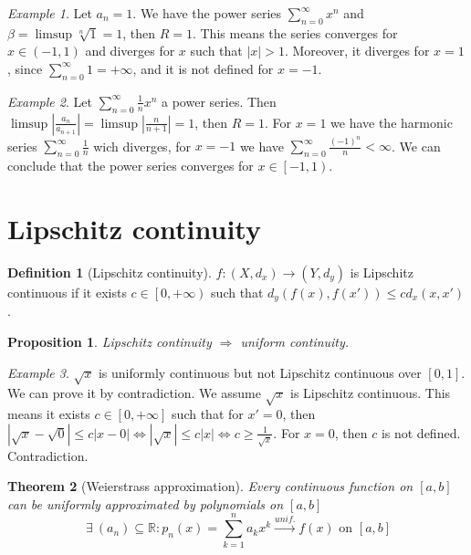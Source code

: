 \documentclass{article}
\newcommand{\DS}{\displaystyle}
\newcommand{\abs}[1]{\left|#1\right|}
\newcommand{\Ar}{\Rightarrow}
\newcommand{\f}[3]{#1 : #2 \rightarrow #3}
\newcommand{\intcc}[1]{\left[#1\right]}
\newcommand{\intco}[1]{\left[#1\right)}
\newcommand{\intoo}[1]{\left(#1\right)}
\newcommand{\tounif}{\xrightarrow{unif.}}
\theoremstyle{definition}
\newtheorem{definition}{Definition}[section]
\theoremstyle{definition}
\theoremstyle{plain}
\newtheorem{theorem}{Theorem}[section]
\theoremstyle{plain}
\theoremstyle{plain}
\theoremstyle{plain}
\newtheorem{proposition}[theorem]{Proposition}
\theoremstyle{definition}
\theoremstyle{remark}
\theoremstyle{remark}
\theoremstyle{remark}
\newtheorem{examplet}{Example}[theorem]
\theoremstyle{remark}
\newcommand{\R}{\mathbb{R}}
\newcommand{\sumn}{\sum_{k=1}^n}
\newcommand{\pseries}[1]{\sum_{n=0}^\infty #1}
\newcommand{\Exists}{\ \exists \ }
\begin{document}
\begin{examplet}
  Let $a_n = 1$. We have the power series $\DS \pseries{x^n}$ and $\beta = \limsup \sqrt[n]{1} = 1$, then $R = 1$. This means the series converges for $x \in \intoo{-1,1}$ and diverges for $x$ such that $|x| > 1$. Moreover, it diverges for $x = 1$, since $\DS \pseries{1} = +\infty$, and it is not defined for $x = -1$.
\end{examplet}

\begin{examplet}
  Let $\DS \pseries{\frac{1}{n}x^n}$ a power series. Then $\limsup \abs{\frac{a_n}{a_{n+1}}} = \limsup \abs{\frac{n}{n+1}} = 1$, then $R = 1$. For $x = 1$ we have the harmonic series $\DS \pseries{\frac{1}{n}}$ wich diverges, for $x = -1$ we have $\DS \pseries{\frac{(-1)^n}{n}} < \infty$. We can conclude that the power series converges for $x \in \intco{-1,1}$.
\end{examplet}


\section{Lipschitz continuity}


\begin{definition}[Lipschitz continuity]
  $\f{f}{(X,d_x)}{(Y,d_y)}$ is Lipschitz continuous if it exists $c \in \intco{0,+\infty}$ such that $d_y(f(x),f(x')) \leq c d_x(x,x')$.
\end{definition}


\begin{proposition}
  Lipschitz continuity $\Ar$ uniform continuity.
\end{proposition}


\begin{examplet}
  $\sqrt{x}$ is uniformly continuous but not Lipschitz continuous over $\intcc{0,1}$. We can prove it by contradiction. We assume $\sqrt{x}$ is Lipschitz continuous. This means it exists $c \in \intcc{0,+\infty}$ such that for $x' = 0$, then $|\sqrt{x} - \sqrt{0}| \leq c |x - 0| \iff |\sqrt{x}| \leq c |x| \iff c \geq \frac{1}{\sqrt{x}}$. For $x = 0$, then $c$ is not defined. Contradiction.
\end{examplet}


\begin{theorem}[Weierstrass approximation]
  Every continuous function on $\intcc{a,b}$ can be uniformly approximated by polynomials on $\intcc{a,b}$
  \[
  \Exists (a_n) \subseteq \R : p_n(x) = \sumn a_k x^k \tounif f(x) \text{ on } \intcc{a,b}
  \]
\end{theorem}
\end{document}
